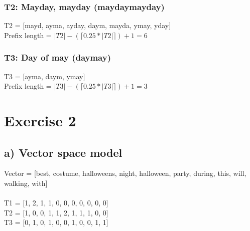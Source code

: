 \documentclass{article}
\begin{document}
\subsubsection*{T2: Mayday, mayday (mayday\textvisiblespace mayday)}
T2 = [\textvisiblespace mayd, ay\textvisiblespace ma, ayday,
day\textvisiblespace m, mayda, y\textvisiblespace may, yday\textvisiblespace ]\\
Prefix length = $|T2| - (\lceil 0.25 * |T2| \rceil ) + 1 = 6$

\subsubsection*{T3: Day of may (day\textvisiblespace may)}
T3 = [ay\textvisiblespace ma, day\textvisiblespace m, y\textvisiblespace may]\\
Prefix length = $|T3| - (\lceil 0.25 * |T3| \rceil ) + 1 = 3$


\vspace{2cm}
\section*{Exercise 2}
\subsection*{a) Vector space model}
Vector = [best, costume, halloweens, night, halloween, party, during, this,
will, walking, with]\\
\\
T1 = [1, 2, 1, 1, 0, 0, 0, 0, 0, 0, 0]\\
T2 = [1, 0, 0, 1, 1, 2, 1, 1, 1, 0, 0]\\
T3 = [0, 1, 0, 1, 0, 0, 1, 0, 0, 1, 1]
\end{document}

